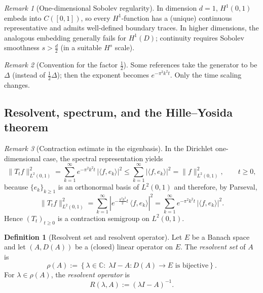 \documentclass[11pt]{article}
\theoremstyle{definition}
\newtheorem{definition}{Definition}
\theoremstyle{remark}
\newtheorem{remark}{Remark}
\begin{document}
\begin{remark}[One-dimensional Sobolev regularity]
In dimension $d=1$, $H^1(0,1)$ embeds into $C([0,1])$, so every $H^1$-function has a (unique) continuous representative and admits well-defined boundary traces.
In higher dimensions, the analogous embedding generally fails for $H^1(D)$; continuity requires Sobolev smoothness $s>\tfrac{d}{2}$ (in a suitable $H^s$ scale).
\end{remark}

\begin{remark}[Convention for the factor $\tfrac12$]
Some references take the generator to be $\Delta$ (instead of $\tfrac12\Delta$); then the exponent becomes $e^{-\pi^2 k^2 t}$.
Only the time scaling changes.
\end{remark}

\subsection*{Resolvent, spectrum, and the Hille--Yosida theorem}

\begin{remark}[Contraction estimate in the eigenbasis]
In the Dirichlet one-dimensional case, the spectral representation yields
\[
    \|T_t f\|_{L^2(0,1)}^2
    =
    \sum_{k=1}^{\infty}
    e^{-\pi^2 k^2 t}\,|\langle f,e_k\rangle|^2
    \le
    \sum_{k=1}^{\infty} |\langle f,e_k\rangle|^2
    =
    \|f\|_{L^2(0,1)}^2,
    \qquad t\ge 0,
\]
because $\{e_k\}_{k\ge 1}$ is an orthonormal basis of $L^2(0,1)$ and therefore, by Parseval,
\[
    \|T_t f\|_{L^2(0,1)}^2
    =
    \sum_{k=1}^{\infty}\left|e^{-\frac{\pi^2 k^2}{2}t}\,\langle f,e_k\rangle\right|^2
    =
    \sum_{k=1}^{\infty}e^{-\pi^2 k^2 t}\,|\langle f,e_k\rangle|^2.
\]
Hence $(T_t)_{t\ge 0}$ is a contraction semigroup on $L^2(0,1)$.
\end{remark}

\begin{definition}[Resolvent set and resolvent operator]
Let $E$ be a Banach space and let $(A,D(A))$ be a (closed) linear operator on $E$.
The \emph{resolvent set} of $A$ is
\[
    \rho(A)
    :=
    \left\{
        \lambda\in\mathbb{C}:\;
        \lambda I - A \colon D(A)\to E \text{ is bijective}
    \right\}.
\]
For $\lambda\in\rho(A)$, the \emph{resolvent operator} is
\[
    R(\lambda,A) := (\lambda I - A)^{-1}.
\]
\end{definition}
\end{document}
